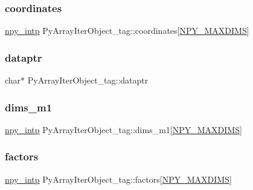 \subsubsection{\texorpdfstring{coordinates}{coordinates}}
{\footnotesize\ttfamily \hyperlink{npy__common_8h_a2d6effc4d5ecb85675ebfcfaa102b483}{npy\+\_\+intp} Py\+Array\+Iter\+Object\+\_\+tag\+::coordinates\mbox{[}\hyperlink{ndarraytypes_8h_a737679ea9ee902bfa707c146051c17b5}{N\+P\+Y\+\_\+\+M\+A\+X\+D\+I\+MS}\mbox{]}}

\mbox{\label{structPyArrayIterObject__tag_a2ae653926ac88f8eb969d6d2510e8903}} 
\subsubsection{\texorpdfstring{dataptr}{dataptr}}
{\footnotesize\ttfamily char$\ast$ Py\+Array\+Iter\+Object\+\_\+tag\+::dataptr}

\mbox{\label{structPyArrayIterObject__tag_aa72585094f04e1352a756d05d8ddbd84}} 
\subsubsection{\texorpdfstring{dims\+\_\+m1}{dims\_m1}}
{\footnotesize\ttfamily \hyperlink{npy__common_8h_a2d6effc4d5ecb85675ebfcfaa102b483}{npy\+\_\+intp} Py\+Array\+Iter\+Object\+\_\+tag\+::dims\+\_\+m1\mbox{[}\hyperlink{ndarraytypes_8h_a737679ea9ee902bfa707c146051c17b5}{N\+P\+Y\+\_\+\+M\+A\+X\+D\+I\+MS}\mbox{]}}

\mbox{\label{structPyArrayIterObject__tag_a055ff887cc3a2ff3451a5e0a4695f8f7}} 
\subsubsection{\texorpdfstring{factors}{factors}}
{\footnotesize\ttfamily \hyperlink{npy__common_8h_a2d6effc4d5ecb85675ebfcfaa102b483}{npy\+\_\+intp} Py\+Array\+Iter\+Object\+\_\+tag\+::factors\mbox{[}\hyperlink{ndarraytypes_8h_a737679ea9ee902bfa707c146051c17b5}{N\+P\+Y\+\_\+\+M\+A\+X\+D\+I\+MS}\mbox{]}}

